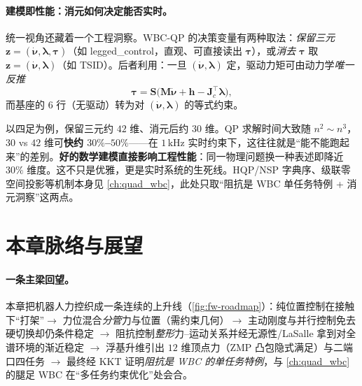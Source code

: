 \paragraph{建模即性能：消元如何决定能否实时。}
统一视角还藏着一个工程洞察。WBC-QP 的决策变量有两种取法：\emph{保留三元} $\mathbf{z}=(\dot{\boldsymbol{\nu}},\boldsymbol{\lambda},\boldsymbol{\tau})$（如 legged\_control，直观、可直接读出 $\boldsymbol{\tau}$），或\emph{消去} $\boldsymbol{\tau}$ 取 $\mathbf{z}=(\dot{\boldsymbol{\nu}},\boldsymbol{\lambda})$（如 TSID）。后者利用：一旦 $(\dot{\boldsymbol{\nu}},\boldsymbol{\lambda})$ 定，驱动力矩可由动力学\emph{唯一反推}
\begin{equation}
  \boldsymbol{\tau}=\mathbf{S}\big(\mathbf{M}\dot{\boldsymbol{\nu}}+\mathbf{h}-\mathbf{J}_c^\top\boldsymbol{\lambda}\big),
  \label{eq:fw-tau-elim}
\end{equation}
而基座的 $6$ 行（无驱动）转为对 $(\dot{\boldsymbol{\nu}},\boldsymbol{\lambda})$ 的等式约束。

\begin{insight}
\label{ins:fw-modeling}
以四足为例，保留三元约 $42$ 维、消元后约 $30$ 维。QP 求解时间大致随 $n^2\!\sim\!n^3$，$30$ vs $42$ 维可\textbf{快约 $30\%$--$50\%$}——在 $1\,\mathrm{kHz}$ 实时约束下，这往往就是“能不能跑起来”的差别。\textbf{好的数学建模直接影响工程性能}：同一物理问题换一种表述即降近 $30\%$ 维度。这不只是优雅，更是实时系统的生死线。HQP/NSP 字典序、级联零空间投影等机制本身见 \cref{ch:quad_wbc}，此处只取“阻抗是 WBC 单任务特例 + 消元洞察”这两点。
\end{insight}

\section{本章脉络与展望}
\label{sec:fw-outlook}

\paragraph{一条主梁回望。}
本章把机器人力控织成一条连续的上升线（\cref{fig:fw-roadmap}）：纯位置控制在接触下“打架”$\to$ 力位混合\emph{分管}力与位置（需约束几何）$\to$ 主动刚度与并行控制免去硬切换却仍条件稳定 $\to$ 阻抗控制\emph{整形}力--运动关系并经无源性/LaSalle 拿到对全谱环境的渐近稳定 $\to$ 浮基升维引出 $12$ 维顶点力（ZMP 凸包隐式满足）与二端口四任务 $\to$ 最终经 KKT 证明\emph{阻抗是 WBC 的单任务特例}，与 \cref{ch:quad_wbc} 的腿足 WBC 在“多任务约束优化”处会合。

